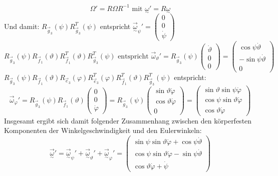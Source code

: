 \documentclass[10pt, letterpaper]{article}
\begin{document}
\[\Omega' = R \Omega R^{-1} \text{ mit } \underset{\sim}{\omega}' = R \underset{\sim}{\omega}\]
Und damit: $R_{\vec{g}_3}(\psi) R_{\vec{g}_3}^T(\psi)$ entspricht $\vec{\underset{\sim}{\omega}}_{\psi}' = \begin{pmatrix} 0 \\ 0 \\ \dot{\psi} \end{pmatrix}$
$$R_{\vec{g}_3}(\psi) R_{\vec{f}_1}(\vartheta) R_{\vec{f}_1}^T(\vartheta) R_{\vec{g}_3}^T(\psi) \text{ entspricht }
\vec{\omega}_\vartheta' = R_{\vec{g}_3}(\psi) \begin{pmatrix} \dot{\vartheta} \\ 0 \\ 0 \end{pmatrix} = \begin{pmatrix} \cos\psi \dot{\vartheta} \\ -\sin\psi \dot{\vartheta} \\ 0 \end{pmatrix}$$
$R_{\vec{g}_3}(\psi) R_{\vec{f}_1}(\vartheta) R_{\vec{e}_3}(\varphi) R_{\vec{e}_3}^T(\varphi) R_{\vec{f}_1}^T(\vartheta) R_{\vec{g}_3}^T(\psi)$ entspricht:
$$\vec{\omega}_\varphi' = R_{\vec{g}_3}(\psi) R_{\vec{f}_1}(\vartheta) \begin{pmatrix} 0 \\ 0 \\ \dot{\varphi} \end{pmatrix} = R_{\vec{g}_3}(\psi) \begin{pmatrix} \sin\vartheta \dot{\varphi} \\ \cos\vartheta \dot{\varphi} \\ 0 \end{pmatrix} = \begin{pmatrix} \sin\vartheta \sin\psi \dot{\varphi} \\ \cos\psi \sin\vartheta \dot{\varphi} \\ \cos\vartheta \dot{\varphi} \end{pmatrix}$$
Insgesamt ergibt sich damit folgender Zusammenhang zwischen den körperfesten Komponenten der Winkelgeschwindigkeit und den Eulerwinkeln:
\[\vec{\underset{\sim}{\omega}}' = \vec{\underset{\sim}{\omega}}_\psi' + \vec{\underset{\sim}{\omega}}_\vartheta' + \vec{\underset{\sim}{\omega}}_\varphi' = \begin{pmatrix} \sin\psi \sin\vartheta \dot{\varphi} + \cos\psi \dot{\vartheta} \\ \cos\psi \sin\vartheta \dot{\varphi} - \sin\psi \dot{\vartheta} \\ \cos\vartheta \dot{\varphi} + \dot{\psi} \end{pmatrix}\]
\end{document}
